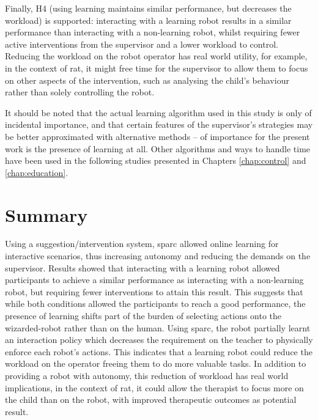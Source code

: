 Finally, H4 (using learning maintains similar performance, but decreases the workload) is supported: interacting with a learning robot results in a similar performance than interacting with a non-learning robot, whilst requiring fewer active interventions from the supervisor and a lower workload to control. Reducing the workload on the robot operator has real world utility, for example, in the context of \gls{rat}, it might free time for the supervisor to allow them to focus on other aspects of the intervention, such as analysing the child's behaviour rather than solely controlling the robot. 

It should be noted that the actual learning algorithm used in this study is only of incidental importance, and that certain features of the supervisor's strategies may be better approximated with alternative methods -- of importance for the present work is the presence of learning at all. Other algorithms and ways to handle time have been used in the following studies presented in Chapters \ref{chap:control} and \ref{chap:education}.

\section{Summary}


Using a suggestion/intervention system, \gls{sparc} allowed online learning for interactive scenarios, thus increasing autonomy and reducing the demands on the supervisor. Results showed that interacting with a learning robot allowed participants to achieve a similar performance as interacting with a non-learning robot, but requiring fewer interventions to attain this result. This suggests that while both conditions allowed the participants to reach a good performance, the presence of learning shifts part of the burden of selecting actions onto the wizarded-robot rather than on the human. Using \gls{sparc}, the robot partially learnt an interaction policy which decreases the requirement on the teacher to physically enforce each robot's actions. This indicates that a learning robot could reduce the workload on the operator freeing them to do more valuable tasks. In addition to providing a robot with autonomy, this reduction of workload has real world implications, in the context of \gls{rat}, it could allow the therapist to focus more on the child than on the robot, with improved therapeutic outcomes as potential result. 


